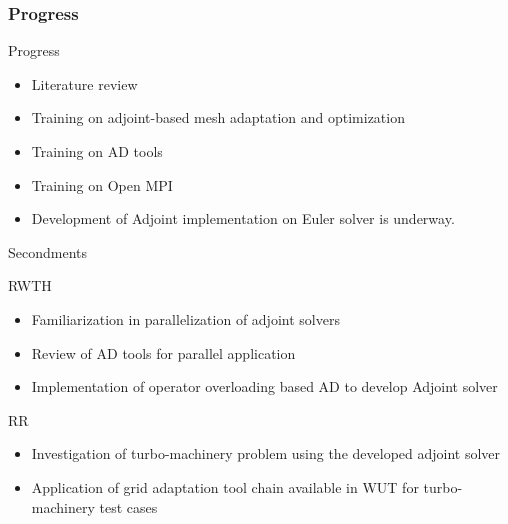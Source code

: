 
\begin{frame}
\frametitle{Progress}
\begin{block}{Progress}
\begin{itemize}
\item Literature review
\item Training on adjoint-based mesh adaptation and optimization
\item Training on AD tools
\item Training on Open MPI
\item Development of Adjoint implementation on Euler solver is underway.
\end{itemize}
\end{block}
\end{frame}

\begin{frame}{Secondments}

\begin{block}{RWTH}
\begin{itemize}
\item Familiarization in parallelization of adjoint solvers
\item Review of AD tools for parallel application
\item Implementation of operator overloading based AD to develop Adjoint solver

\end{itemize}
\end{block}

\begin{block}{RR}
\begin{itemize}
\item Investigation of turbo-machinery problem using the developed adjoint solver 
\item Application of grid adaptation tool chain available in WUT for turbo-machinery test cases
\end{itemize}
\end{block}
\end{frame}

